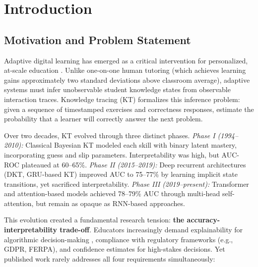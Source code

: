 \documentclass[preprint,12pt]{elsarticle}
\begin{document}
\begin{frontmatter}
\begin{abstract}
\begin{keyword}
knowledge tracing \sep hypergraph neural networks \sep uncertainty quantification \sep adaptive learning systems \sep educational data mining \sep calibration \sep transformer architecture \sep intelligent tutoring systems
\end{keyword}

\end{abstract}

\end{frontmatter}

\linenumbers

\section{Introduction}\label{sec:introduction}

\subsection{Motivation and Problem Statement}

Adaptive digital learning has emerged as a critical intervention for personalized, at-scale education \cite{Bloom1984TwoSigma,VanLehn2011}. Unlike one-on-one human tutoring (which achieves learning gains approximately two standard deviations above classroom average), adaptive systems must infer unobservable student knowledge states from observable interaction traces. Knowledge tracing (KT) formalizes this inference problem: given a sequence of timestamped exercises and correctness responses, estimate the probability that a learner will correctly answer the next problem.

Over two decades, KT evolved through three distinct phases. \textit{Phase I (1994--2010):} Classical Bayesian KT \cite{corbett1994} modeled each skill with binary latent mastery, incorporating guess and slip parameters. Interpretability was high, but AUC-ROC plateaued at 60--65\%. \textit{Phase II (2015--2019):} Deep recurrent architectures (DKT, GRU-based KT) improved AUC to 75--77\% by learning implicit state transitions, yet sacrificed interpretability. \textit{Phase III (2019--present):} Transformer and attention-based models \cite{Liu2023Self,Choi2020Towards} achieved 78--79\% AUC through multi-head self-attention, but remain as opaque as RNN-based approaches.

This evolution created a fundamental research tension: \textbf{the accuracy-interpretability trade-off}. Educators increasingly demand explainability for algorithmic decision-making \cite{Bussone2015Understanding,Amershi2019Guidelines}, compliance with regulatory frameworks (e.g., GDPR, FERPA), and confidence estimates for high-stakes decisions. Yet published work rarely addresses all four requirements simultaneously:
\end{document}

